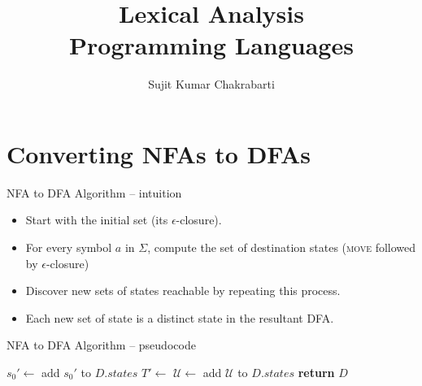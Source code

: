 \documentclass{beamer}
\title[Sujit]{Lexical Analysis \\
Programming Languages}
\author{Sujit Kumar Chakrabarti}
\institute{IIITB}
\date{}
\begin{document}
\maketitle

\section{Converting NFAs to DFAs}

\begin{frame}{NFA to DFA}
{Algorithm -- intuition}

\pause
\begin{itemize}
\item Start with the initial set (its $\epsilon$-closure).
\item For every symbol $a$ in $\Sigma$, compute the set of destination states (\textsc{move} followed by $\epsilon$-closure)
\item Discover new sets of states reachable by repeating this process.
\item Each new set of state is a distinct state in the resultant DFA.
\end{itemize}
\end{frame}

\begin{frame}{NFA to DFA}
{Algorithm -- pseudocode}
\begin{footnotesize}
\begin{algorithmic}[0]
\pause
  \State $s_0' \gets$ 
  \State add $s_0'$ to $D.states$
  \State {}
    \State {}
    	  \State $T' \gets$ 
      \State $\mathcal{U} \gets$ 
        \State add $\mathcal{U}$ to $D.states$
        \State {}
      \EndIf
    \EndFor
  \EndWhile
  \State \textbf{return} $D$
\EndProcedure

\end{algorithmic}
\end{footnotesize}
\end{frame}
\end{document}
